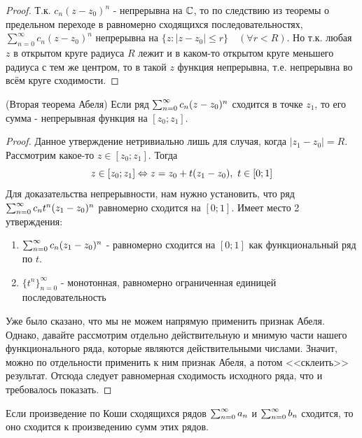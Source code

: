 \begin{proof}
	Т.к. $c_n(z-z_0)^n$ - непрерывна на $\mathbb{C}$, то по следствию из теоремы о предельном переходе в равномерно сходящихся последовательностях, $\sum\limits_{n=0}^\infty c_n(z-z_0)^n$ непрерывна на $\{z : |z-z_0|\le r\}\quad (\forall r < R)$. Но т.к. любая $z$ в открытом круге радиуса $R$ лежит и в каком-то открытом круге меньшего радиуса с тем же центром, то в такой $z$ функция непрерывна, т.е. непрерывна во всём круге сходимости. 
\end{proof}

\begin{theorem} (Вторая теорема Абеля)
	Если ряд $\sum_{n = 0}^\infty c_n(z - z_0)^n$ сходится в точке $z_1$, то его сумма - непрерывная функция на $[z_0; z_1]$.
\end{theorem}

\begin{proof}
	Данное утверждение нетривиально лишь для случая, когда $|z_1 - z_0| = R$. Рассмотрим какое-то $z \in [z_0; z_1]$. Тогда
	\[
		z \in [z_0; z_1] \Leftrightarrow z = z_0 + t(z_1 - z_0),\ t \in [0; 1]
	\]
	Для доказательства непрерывности, нам нужно установить, что ряд $\sum_{n = 0}^\infty c_n t^n(z_1 - z_0)^n$ равномерно сходится на $[0; 1]$. Имеет место 2 утверждения:
	\begin{enumerate}
		\item $\sum_{n = 0}^\infty c_n(z_1 - z_0)^n$ - равномерно сходится на $[0; 1]$ как функциональный ряд по $t$.
		
		\item $\{t^n\}_{n = 0}^\infty$ - монотонная, равномерно ограниченная единицей последовательность
	\end{enumerate}
	Уже было сказано, что мы не можем напрямую применить признак Абеля. Однако, давайте рассмотрим отдельно действительную и мнимую части нашего функционального ряда, которые являются действительными числами. Значит, можно по отдельности применить к ним признак Абеля, а потом <<склеить>> результат. Отсюда следует равномерная сходимость исходного ряда, что и требовалось показать.
\end{proof}

\begin{corollary}
	Если произведение по Коши сходящихся рядов $\sum_{n = 0}^\infty a_n$ и $\sum_{n = 0}^\infty b_n$ сходится, то оно сходится к произведению сумм этих рядов.
\end{corollary}

